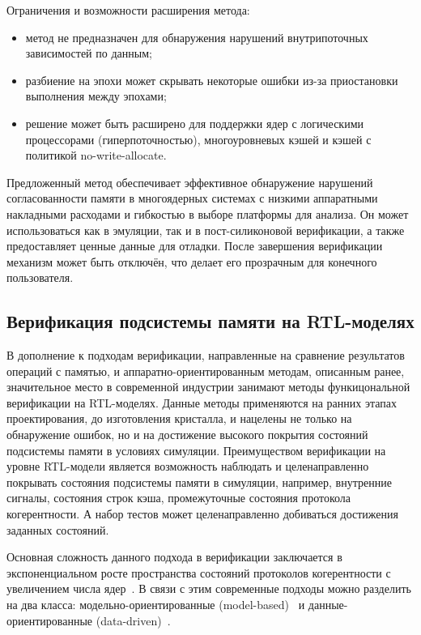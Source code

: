 Ограничения и возможности расширения метода:
\begin{itemize}
  \item метод не предназначен для обнаружения нарушений
    внутрипоточных зависимостей по данным;
  \item разбиение на эпохи может скрывать некоторые ошибки из-за
    приостановки выполнения между эпохами;
  \item решение может быть расширено для поддержки ядер с логическими
    процессорами (гиперпоточностью), многоуровневых кэшей и кэшей с
    политикой no-write-allocate.
\end{itemize}

Предложенный метод обеспечивает эффективное обнаружение нарушений
согласованности памяти в многоядерных системах с низкими аппаратными
накладными расходами и гибкостью в выборе платформы для анализа. Он
может использоваться как в эмуляции, так и в пост-силиконовой
верификации, а также предоставляет ценные данные для отладки. После
завершения верификации механизм может быть отключён, что делает его
прозрачным для конечного пользователя.

\subsection{Верификация подсистемы памяти на RTL-моделях}
\label{ch1:sec/pre-silicon}

В дополнение к подходам верификации, направленные на сравнение
результатов операций с памятью, и аппаратно-ориентированным
методам, описанным ранее, значительное место в современной индустрии
занимают методы функицональной верификации на RTL-моделях. Данные
методы применяются на
ранних этапах проектирования, до изготовления кристалла, и нацелены
не только на обнаружение
ошибок, но и на достижение высокого покрытия состояний подсистемы
памяти в условиях симуляции.
Преимуществом верификации на уровне RTL-модели является возможность
наблюдать и целенаправленно покрывать состояния подсистемы памяти в
симуляции, например, внутренние сигналы, состояния строк кэша,
промежуточные состояния протокола когерентности.
А набор тестов может целенаправленно добиваться достижения заданных состояний.

Основная сложность данного подхода в верификации заключается в
экспоненциальном росте пространства состояний протоколов
когерентности с увеличением числа ядер~\cite{martin2012chip}. В связи
с этим современные подходы можно разделить на два класса:
модельно-ориентированные (model-based)~\cite{devarajegowda2021model}
и данные-ориентированные (data-driven)~\cite{andrade2020directed}.

